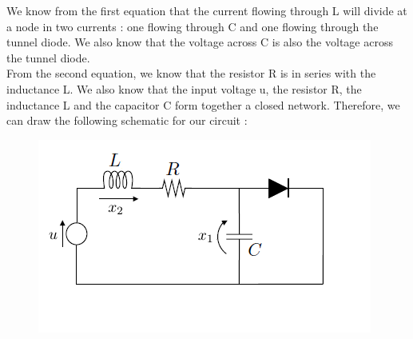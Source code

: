 We know from the first equation that the current flowing through L will divide at a node in two currents : one flowing through C and one flowing through the tunnel diode. We also know that the voltage across C is also the voltage across the tunnel diode.\\

From the second equation, we know that the resistor R is in series with the inductance L. We also know that the input voltage u, the resistor R, the inductance L and the capacitor C form together a closed network. Therefore, we can draw the following schematic for our circuit :

\begin{figure}[htbp]
\begin{center}
\includegraphics[scale=0.8]{ex34}
\end{center}
\end{figure}